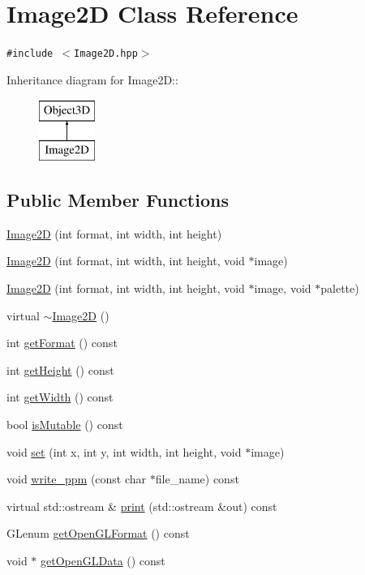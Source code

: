 \hypertarget{classm3g_1_1Image2D}{
\section{Image2D Class Reference}
\label{classm3g_1_1Image2D}
}
{\tt \#include $<$Image2D.hpp$>$}

Inheritance diagram for Image2D::\begin{figure}[H]
\begin{center}
\leavevmode
\includegraphics[height=2cm]{classm3g_1_1Image2D}
\end{center}
\end{figure}
\subsection*{Public Member Functions}
\begin{CompactItemize}
\item 
\hyperlink{classm3g_1_1Image2D_cea21be298c6584490d2b714c4b29d6b}{Image2D} (int format, int width, int height)
\item 
\hyperlink{classm3g_1_1Image2D_8cf9a47f24ed50fe66686c1117fb048c}{Image2D} (int format, int width, int height, void $\ast$image)
\item 
\hyperlink{classm3g_1_1Image2D_f498914ceac20ff9b1708c55ff1484e6}{Image2D} (int format, int width, int height, void $\ast$image, void $\ast$palette)
\item 
virtual \hyperlink{classm3g_1_1Image2D_7ac703fe7edbb053dd2246ea1bb43200}{$\sim$Image2D} ()
\item 
int \hyperlink{classm3g_1_1Image2D_c08e2752176d267cc4429d4d185975b8}{getFormat} () const 
\item 
int \hyperlink{classm3g_1_1Image2D_317329daf960a1759801c0f16d43d5a3}{getHeight} () const 
\item 
int \hyperlink{classm3g_1_1Image2D_f149cb053bc8b5fbc1364b5dbb934488}{getWidth} () const 
\item 
bool \hyperlink{classm3g_1_1Image2D_d687aabba553d1c66bfc253ec7e5bd05}{isMutable} () const 
\item 
void \hyperlink{classm3g_1_1Image2D_fe9ef1abefb9e92b38687e27c9004bdc}{set} (int x, int y, int width, int height, void $\ast$image)
\item 
void \hyperlink{classm3g_1_1Image2D_32ee5b2bcc9c7bf69b925413eeccb4bf}{write\_\-ppm} (const char $\ast$file\_\-name) const 
\item 
virtual std::ostream \& \hyperlink{classm3g_1_1Image2D_6fea17fa1532df3794f8cb39cb4f911f}{print} (std::ostream \&out) const 
\item 
GLenum \hyperlink{classm3g_1_1Image2D_7923da2fe82fee768ec9937a693e843c}{getOpenGLFormat} () const 
\item 
void $\ast$ \hyperlink{classm3g_1_1Image2D_b837b1bdda59947a6d818c448965c502}{getOpenGLData} () const 
\end{CompactItemize}

